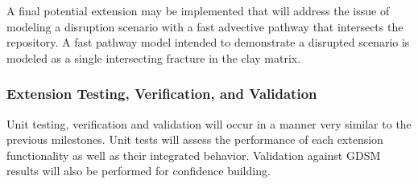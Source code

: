 
    A final potential extension may be implemented that will address the issue of 
    modeling a disruption scenario with a fast advective pathway that intersects 
    the repository.  A fast pathway model intended to demonstrate a disrupted 
    scenario is modeled as a single intersecting fracture in the clay matrix. 



  \subsubsection{Extension Testing, Verification, and Validation}


  Unit testing, verification and validation will occur in a manner very similar 
  to the previous milestones. Unit tests will assess the performance of each 
  extension functionality as well as their integrated behavior. Validation 
  against \gls{GDSM} results will also be performed for confidence building. 




